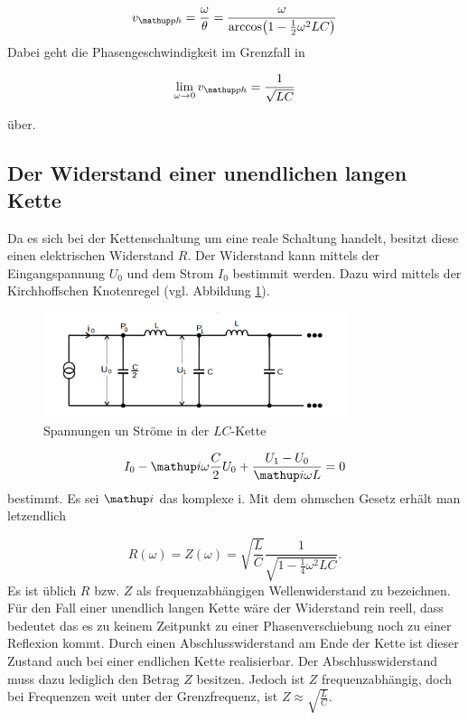 \begin{equation}
\label{eq:phasen_esc}
v\ua{ph}=\frac{\omega}{\theta}=\frac{\omega}{\arccos\!\left(1-\frac{1}{2}\omega^2LC\right)}
\end{equation}
Dabei geht die Phasengeschwindigkeit im Grenzfall in

\begin{equation*}
\lim_{\omega\to 0}v\ua{ph}=\frac{1}{\sqrt{LC}}
\end{equation*}

über.
\subsection{Der Widerstand einer unendlichen langen Kette}
Da es sich bei der Kettenschaltung um eine reale Schaltung handelt,
besitzt diese einen elektrischen Widerstand $R$.
Der Widerstand kann mittels der Eingangspannung $U_0$ und dem Strom $I_0$ bestimmit werden.
Dazu wird mittels der Kirchhoffschen Knotenregel (vgl. Abbildung \ref{fig:bestimmung_impe}). %
\begin{figure}
  \centering
  \includegraphics[width=0.8\textwidth]{bilder/eigenimpendanz.png}
  \caption{Spannungen un Ströme in der $LC$-Kette}
  \label{fig:bestimmung_impe}
\end{figure}
\begin{equation*}
I_0 - \map{i}\omega\frac{C}{2}U_0+\frac{U_1-U_0}{\map{i}\omega L}=0
\end{equation*}
bestimmt.
Es sei $\map{i}$ das komplexe i. %
Mit dem ohmschen Gesetz erhält man letzendlich %

\begin{equation}
R(\omega)=Z(\omega)=\sqrt{\frac{L}{C}}\frac{1}{\sqrt{1-\frac{1}{4}\omega^2LC}}.
\label{eq: wellenwiderstand_LC}
\end{equation}
Es ist üblich $R$ bzw. $Z$ als frequenzabhängigen Wellenwiderstand zu bezeichnen.
Für den Fall einer unendlich langen Kette wäre der Widerstand rein reell, dass bedeutet %
das es zu keinem Zeitpunkt zu einer Phasenverschiebung noch zu einer Reflexion kommt.
Durch einen Abschlusswiderstand am Ende der Kette ist dieser Zustand auch bei einer endlichen Kette
realisierbar. Der Abschlusswiderstand muss dazu lediglich den Betrag $Z$ besitzen.
Jedoch ist $Z$ frequenzabhängig, doch bei Frequenzen weit unter der Grenzfrequenz, ist
$Z\approx \sqrt{\frac{L}{C}}$. %

